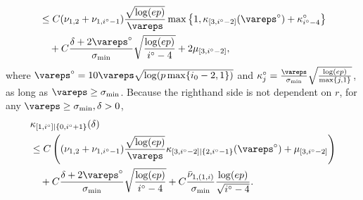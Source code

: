 \documentclass[aos]{imsart}
\begin{document}
\begin{appendix}
\begin{equation*}
\begin{aligned}
    & \leq C (\nu_{1,2} + \nu_{1,i^\circ-1}) 
    \frac{\sqrt{\log(ep)}}{\vareps} 
    \max\left\{1, \kappa_{[3,i^\circ-2]}(\vareps^\circ) + \kappa^\circ_{i^\circ-4} \right\}
    \\
    & \quad + C\frac{\delta + 2\vareps^\circ}{\sigma_{\min}} \sqrt{\frac{\log(ep)}{i^\circ-4}} + 2\mu_{[3,i^\circ-2]},
\end{aligned}
\end{equation*}
where $\vareps^\circ = 10\vareps\sqrt{\log(p\max\{i_0-2,1\})}$ and $\kappa^\circ_j = \frac{\vareps}{\sigma_{\min}} \sqrt{\frac{\log(ep)}{\max\{j,1\}}}$, as long as $\vareps \geq \sigma_{\min}$.
%
Because the righthand side is not dependent on $r$, for any $\vareps \geq \sigma_{\min}, \delta > 0$, 
\begin{equation*} %
\begin{aligned}
    & \kappa_{[1,i^\circ]|\{0,i^\circ+1\}}(\delta) \\
    & \leq C \left( 
        (\nu_{1,2} + \nu_{1,i^\circ-1}) \frac{\sqrt{\log(ep)}}{\vareps} \kappa_{[3,i^\circ-2]|\{2,i^\circ-1\}}(\vareps^\circ)
        + \mu_{[3,i^\circ-2]} 
    \right)\\
    & \quad + C\frac{\delta + 2\vareps^\circ}{\sigma_{\min}} \sqrt{\frac{\log(ep)}{i^\circ-4}}
    + C\frac{\bar\nu_{1,(1,i)}}{\sigma_{\min}} \frac{\log(ep)}{\sqrt{i^\circ-4}}.
\end{aligned}
\end{equation*}







\end{appendix}
\end{document}
